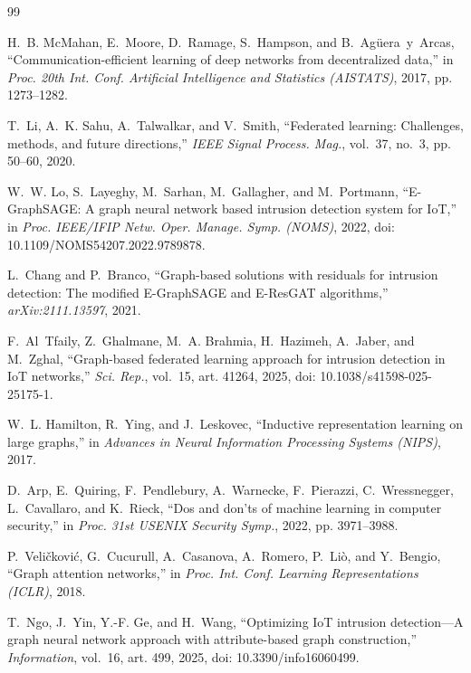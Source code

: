 \documentclass[journal]{IEEEtran}
\begin{document}

\begin{thebibliography}{99}

H.~B. McMahan, E.~Moore, D.~Ramage, S.~Hampson, and B.~Ag{\"u}era~y~Arcas, ``Communication-efficient learning of deep networks from decentralized data,'' in \emph{Proc. 20th Int. Conf. Artificial Intelligence and Statistics (AISTATS)}, 2017, pp. 1273--1282.

T.~Li, A.~K. Sahu, A.~Talwalkar, and V.~Smith, ``Federated learning: Challenges, methods, and future directions,'' \emph{IEEE Signal Process. Mag.}, vol.~37, no.~3, pp. 50--60, 2020.

W.~W. Lo, S.~Layeghy, M.~Sarhan, M.~Gallagher, and M.~Portmann, ``E-GraphSAGE: A graph neural network based intrusion detection system for IoT,'' in \emph{Proc. IEEE/IFIP Netw. Oper. Manage. Symp. (NOMS)}, 2022, doi: 10.1109/NOMS54207.2022.9789878.

L.~Chang and P.~Branco, ``Graph-based solutions with residuals for intrusion detection: The modified E-GraphSAGE and E-ResGAT algorithms,'' \emph{arXiv:2111.13597}, 2021.

F.~Al~Tfaily, Z.~Ghalmane, M.~A. Brahmia, H.~Hazimeh, A.~Jaber, and M.~Zghal, ``Graph-based federated learning approach for intrusion detection in IoT networks,'' \emph{Sci. Rep.}, vol.~15, art. 41264, 2025, doi: 10.1038/s41598-025-25175-1.

W.~L. Hamilton, R.~Ying, and J.~Leskovec, ``Inductive representation learning on large graphs,'' in \emph{Advances in Neural Information Processing Systems (NIPS)}, 2017.

D.~Arp, E.~Quiring, F.~Pendlebury, A.~Warnecke, F.~Pierazzi, C.~Wressnegger, L.~Cavallaro, and K.~Rieck, ``Dos and don'ts of machine learning in computer security,'' in \emph{Proc. 31st USENIX Security Symp.}, 2022, pp. 3971--3988.

P.~Veli{\v{c}}kovi{\'c}, G.~Cucurull, A.~Casanova, A.~Romero, P.~Li{\`o}, and Y.~Bengio, ``Graph attention networks,'' in \emph{Proc. Int. Conf. Learning Representations (ICLR)}, 2018.

T.~Ngo, J.~Yin, Y.-F. Ge, and H.~Wang, ``Optimizing IoT intrusion detection---A graph neural network approach with attribute-based graph construction,'' \emph{Information}, vol.~16, art. 499, 2025, doi: 10.3390/info16060499.


\end{thebibliography}
\end{document}
